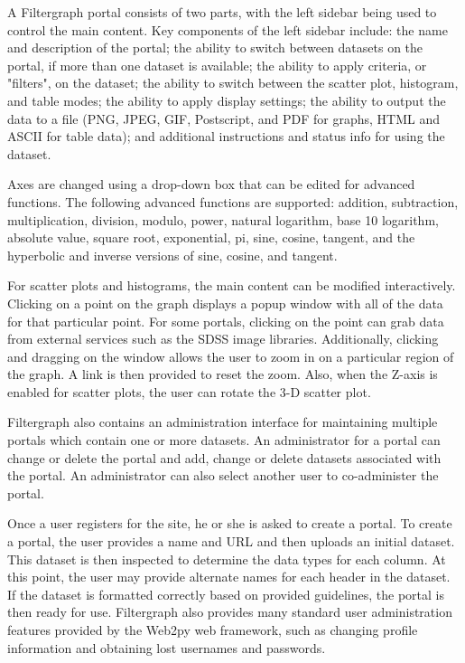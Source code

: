 A Filtergraph portal consists of two parts, with the left sidebar being used to control the main content. Key components of the left sidebar include: the name and description of the portal; the ability to switch between datasets on the portal, if more than one dataset is available; the ability to apply criteria, or "filters", on the dataset; the ability to switch between the scatter plot, histogram, and table modes; the ability to apply display settings; the ability to output the data to a file (PNG, JPEG, GIF, Postscript, and PDF for graphs, HTML and ASCII for table data); and additional instructions and status info for using the dataset.

Axes are changed using a drop-down box that can be edited for advanced functions. The following advanced functions are supported: addition, subtraction, multiplication, division, modulo, power, natural logarithm, base 10 logarithm, absolute value, square root, exponential, pi, sine, cosine, tangent, and the hyperbolic and inverse versions of sine, cosine, and tangent.

For scatter plots and histograms, the main content can be modified interactively. Clicking on a point on the graph displays a popup window with all of the data for that particular point. For some portals, clicking on the point can grab data from external services such as the SDSS image libraries. Additionally, clicking and dragging on the window allows the user to zoom in on a particular region of the graph. A link is then provided to reset the zoom. Also, when the Z-axis is enabled for scatter plots, the user can rotate the 3-D scatter plot.

Filtergraph also contains an administration interface for maintaining multiple portals which contain one or more datasets. An administrator for a portal can change or delete the portal and add, change or delete datasets associated with the portal. An administrator can also select another user to co-administer the portal.

Once a user registers for the site, he or she is asked to create a portal. To create a portal, the user provides a name and URL and then uploads an initial dataset. This dataset is then inspected to determine the data types for each column. At this point, the user may provide alternate names for each header in the dataset. If the dataset is formatted correctly based on provided guidelines, the portal is then ready for use. Filtergraph also provides many standard user administration features provided by the Web2py web framework, such as changing profile information and obtaining lost usernames and passwords.



